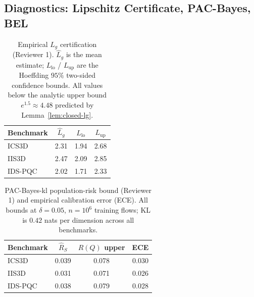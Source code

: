 \documentclass{ieeeaccess}
\begin{document}
\begin{table}[!t]
\caption{Reference baselines (different threat model). Under a
signature/regex threat model these systems are competitive on clean
traffic but degrade catastrophically under any input-space
perturbation, whether or not it is gradient-adaptive.}
\label{tab:commercial}
\centering
\small
{}
\end{table}

\subsection{Diagnostics: Lipschitz Certificate, PAC-Bayes, BEL}
\label{subsec:diagnostics}

\begin{table}[!t]
\caption{Empirical $L_g$ certification (Reviewer 1). $\hat L_g$ is the
mean estimate; $L_{\mathrm{lo}}$ / $L_{\mathrm{up}}$ are the Hoeffding
$95\%$ two-sided confidence bounds. All values below the analytic
upper bound $e^{1.5}\!\approx\!4.48$ predicted by
Lemma~\ref{lem:closed-lg}.}
\label{tab:lg}
\centering
\small
\begin{tabular}{@{}lccc@{}}
\toprule
Benchmark & $\hat L_g$ & $L_{\mathrm{lo}}$ & $L_{\mathrm{up}}$\\
\midrule
ICS3D    & 2.31 & 1.94 & 2.68 \\
IIS3D    & 2.47 & 2.09 & 2.85 \\
IDS-PQC  & 2.02 & 1.71 & 2.33 \\
\bottomrule
\end{tabular}
\end{table}

\begin{table}[!t]
\caption{PAC-Bayes-kl population-risk bound
(Reviewer 1) and empirical calibration error (ECE). All bounds at
$\delta=0.05$, $n=10^6$ training flows; KL is $0.42$ nats per
dimension across all benchmarks.}
\label{tab:pacbayes}
\centering
\small
\begin{tabular}{@{}lccc@{}}
\toprule
Benchmark & $\widehat R_S$ & $R(Q)$ upper & ECE \\
\midrule
ICS3D    & 0.039 & 0.078 & 0.030 \\
IIS3D    & 0.031 & 0.071 & 0.026 \\
IDS-PQC  & 0.038 & 0.079 & 0.028 \\
\bottomrule
\end{tabular}
\end{table}
\end{document}
